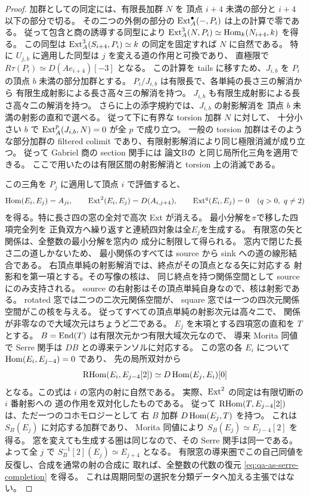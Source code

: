 \begin{proof}
加群としての同定には、有限長加群 $N$ を
頂点 $i+4$ 未満の部分と $i+4$ 以下の部分で切る。
その二つの外側の部分の $\operatorname{Ext}_A^\bullet(-,P_i)$ は上の計算で零である。
従って包含と商の誘導する同型により
$\operatorname{Ext}_A^3(N,P_i)\simeq\operatorname{Hom}_k(N_{i+4},k)$ を得る。
この同型は $\operatorname{Ext}_A^3(S_{i+4},P_i)\simeq k$ の同定を固定すれば
$N$ に自然である。
特に $U_{j,b}$ に適用した同型は $j$ を変える道の作用と可換であり、
直極限で $R\tau(P_i)\simeq D(Ae_{i+4})[-3]$ となる。
この計算を tails に移すため、$J_{i,b}$ を
$P_i$ の頂点 $b$ 未満の部分加群とする。
$P_i/J_{i,b}$ は有限長で、各単純の長さ三の解消から
有限生成射影による長さ高々三の解消を持つ。
$J_{i,b}$ も有限生成射影による長さ高々二の解消を持つ。
さらに上の添字規約では、$J_{i,b}$ の射影解消を
頂点 $b$ 未満の射影の直和で選べる。
従って下に有界な torsion 加群 $N$ に対して、
十分小さい $b$ で $\operatorname{Ext}_A^p(J_{i,b},N)=0$ が全 $p$ で成り立つ。
一般の torsion 加群はそのような部分加群の filtered colimit
であり、有限射影解消により同じ極限消滅が成り立つ。
従って Gabriel 商の section 関手には
論文Bの \cite[式 \texttt{eq:cubic-tails-section-colimit} と
\texttt{eq:cubic-tails-derived-localization}]{QuadricModuli2026}
と同じ局所化三角を適用できる。
ここで用いたのは有限区間の射影解消と torsion 上の消滅である。

この三角を $P_j$ に適用して頂点 $i$ で評価すると、
\[
 \operatorname{Hom}(E_i,E_j)=A_{ji},\qquad
 \operatorname{Ext}^2(E_i,E_j)=D(A_{i,j+4}),\qquad
 \operatorname{Ext}^q(E_i,E_j)=0\quad(q>0,\ q\ne2)
\]
を得る。特に長さ四の窓の全対で高次 Ext が消える。
最小分解を$\pi$で移した四項完全列を
正負双方へ繰り返すと連続四対象は全$E_j$を生成する。
有限窓の矢と関係は、全整数の最小分解を窓内の
成分に制限して得られる。
窓内で閉じた長さ二の道しかないため、
最小関係のすべては source から sink への道の線形結合である。
右頂点単純の射影解消では、終点がその頂点となる矢に対応する
射影和を第一項とする。その写像の核は、
同じ終点を持つ関係空間として source にのみ支持される。
source の右射影はその頂点単純自身なので、核は射影である。
rotated 窓では二つの二次元関係空間が、
square 窓では一つの四次元関係空間がこの核を与える。
従ってすべての頂点単純の射影次元は高々二で、
関係が非零なので大域次元はちょうど二である。
$E_j$ を末項とする四項窓の直和を $T$ とする。
$B=\operatorname{End}(T)$ は有限次元かつ有限大域次元なので、
導来 Morita 同値で Serre 関手は $DB$ との導来テンソルに対応する。
この窓の各 $E_i$ について $\operatorname{Hom}(E_i,E_{j-4})=0$ であり、
先の局所双対から
\[
 \operatorname{RHom}(E_i,E_{j-4}[2])\simeq D\operatorname{Hom}(E_j,E_i)[0]
\]
となる。この式は $i$ の窓内の射に自然である。
実際、$\operatorname{Ext}^2$ の同定は有限切断の $i$ 番射影への
道の作用を双対化したものである。
従って $\operatorname{RHom}(T,E_{j-4}[2])$ は、ただ一つのコホモロジーとして
右 $B$ 加群 $D\operatorname{Hom}(E_j,T)$ を持つ。
これは $S_B(E_j)$ に対応する加群であり、
Morita 同値により $S_B(E_j)\simeq E_{j-4}[2]$ を得る。
窓を変えても生成する圏は同じなので、その Serre 関手は同一である。
よって全 $j$ で $S_B^{-1}[2](E_j)\simeq E_{j+4}$ となる。
有限窓の導来圏でこの自己同値を反復し、合成を通常の射の合成に
取れば、全整数の代数の復元 \eqref{eq:qa-as-serre-completion} を得る。
これは周期同型の選択を分類データへ加える主張ではない。
\end{proof}

